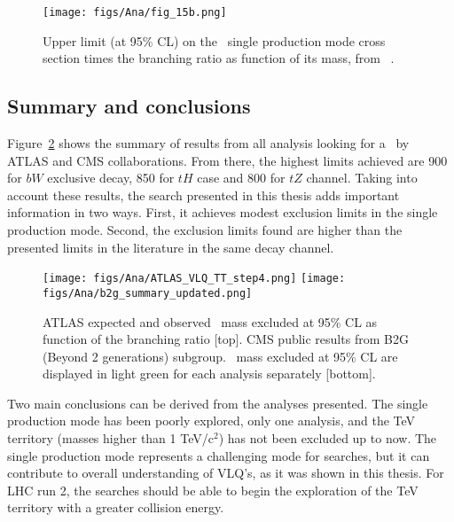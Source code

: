 \begin{figure}[!Hhtbp]
  \begin{center}
    \texttt{[image: figs/Ana/fig\_15b.png]}
    \caption{Upper limit (at 95\% CL) on the \Tp~single production mode cross section times the branching ratio as function of its mass, from ~\cite{Aad:2014efa}.}
    \label{fig:SingleATLASres}
  \end{center}
\end{figure}

\subsection{Summary and conclusions}
\label{sec:SumCon}

Figure~\ref{fig:SummaryRes} shows the summary of results from all analysis looking for a \Tp~by ATLAS and CMS collaborations. From there, the highest limits achieved are 900 \GeVcc for $bW$ exclusive decay, 850 \GeVcc for $tH$ case and 800 \GeVcc for $tZ$ channel. Taking into account these results, the search presented in this thesis adds important information in two ways. First, it achieves modest exclusion limits in the single production mode. Second, the exclusion limits found are higher than the presented limits in the literature in the same decay channel. 

\begin{figure}[!Hhtbp]
  \begin{center}
    \texttt{[image: figs/Ana/ATLAS\_VLQ\_TT\_step4.png]}
    \texttt{[image: figs/Ana/b2g\_summary\_updated.png]}
    \caption{ATLAS expected and observed \Tp~mass excluded at 95\% CL as function of the branching ratio [top]. CMS public results from B2G (Beyond 2 generations) subgroup. \Tp~mass excluded at 95\% CL are displayed in light green for each analysis separately [bottom].}
    \label{fig:SummaryRes}
  \end{center}
\end{figure}

Two main conclusions can be derived from the analyses presented. The single production mode has been poorly explored, only one analysis, and the TeV territory (masses higher than 1 TeV/$\text{c}^{2}$) has not been excluded up to now. The single production mode represents a challenging mode for searches, but it can contribute to overall understanding of VLQ's, as it was shown in this thesis. For LHC run 2, the searches should be able to begin the exploration of the TeV territory with a greater collision energy. 